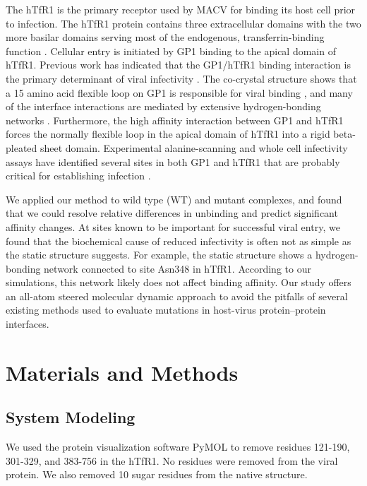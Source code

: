\documentclass[12pt]{article}
\begin{document}
The hTfR1 is the primary receptor used by MACV for binding its host cell prior to infection. The hTfR1 protein contains three extracellular domains with the two more basilar domains serving most of the endogenous, transferrin-binding function \citep{Abraham2010,Rad20112}. Cellular entry is initiated by GP1 binding to the apical domain of hTfR1. Previous work has indicated that the GP1/hTfR1 binding interaction is the primary determinant of viral infectivity \citep{Rad20111,Rad20112}. The co-crystal structure shows that a 15 amino acid flexible loop on GP1 is responsible for viral binding \citep{Abraham2010,Rad20112}, and many of the interface interactions are mediated by extensive hydrogen-bonding networks \citep{Abraham2010}. Furthermore, the high affinity interaction between GP1 and hTfR1 forces the normally flexible loop in the apical domain of hTfR1 into a rigid beta-pleated sheet domain. Experimental alanine-scanning and whole cell infectivity assays have identified several sites in both GP1 and hTfR1 that are probably critical for establishing infection \citep{Rad20111,Rad20112}.

We applied our method to wild type (WT) and mutant complexes, and found that we could resolve relative differences in unbinding and predict significant affinity changes. At sites known to be important for successful viral entry, we found that the biochemical cause of reduced infectivity is often not as simple as the static structure suggests. For example, the static structure shows a hydrogen-bonding network connected to site Asn348 in hTfR1. According to our simulations, this network likely does not affect binding affinity. Our study offers an all-atom steered molecular dynamic approach to avoid the pitfalls of several existing methods used to evaluate mutations in host-virus protein--protein interfaces.

\section*{Materials and Methods}

\subsection*{System Modeling}
We used the protein visualization software PyMOL \citep{PyMOL} to remove residues 121-190, 301-329, and 383-756 in the hTfR1. No residues were removed from the viral protein. We also removed 10 sugar residues from the native structure.
\end{document}
